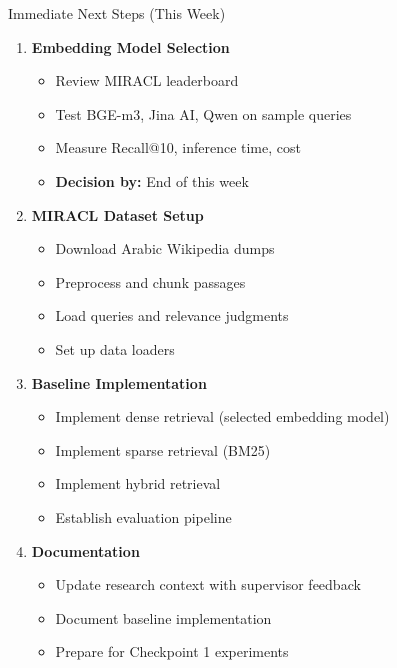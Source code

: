 \documentclass[aspectratio=169]{beamer}
\begin{document}
\begin{frame}{Immediate Next Steps (This Week)}
\begin{enumerate}
    \item \textbf{Embedding Model Selection}
    \begin{itemize}
        \item Review MIRACL leaderboard
        \item Test BGE-m3, Jina AI, Qwen on sample queries
        \item Measure Recall@10, inference time, cost
        \item \textbf{Decision by:} End of this week
    \end{itemize}
    
    \item \textbf{MIRACL Dataset Setup}
    \begin{itemize}
        \item Download Arabic Wikipedia dumps
        \item Preprocess and chunk passages
        \item Load queries and relevance judgments
        \item Set up data loaders
    \end{itemize}
    
    \item \textbf{Baseline Implementation}
    \begin{itemize}
        \item Implement dense retrieval (selected embedding model)
        \item Implement sparse retrieval (BM25)
        \item Implement hybrid retrieval
        \item Establish evaluation pipeline
    \end{itemize}
    
    \item \textbf{Documentation}
    \begin{itemize}
        \item Update research context with supervisor feedback
        \item Document baseline implementation
        \item Prepare for Checkpoint 1 experiments
    \end{itemize}
\end{enumerate}
\end{frame}
\end{document}
